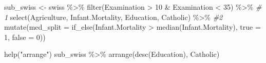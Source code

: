 \documentclass[
]{book}
\newenvironment{Shaded}{\begin{snugshade}}{\end{snugshade}}
\newcommand{\AttributeTok}[1]{\textcolor[rgb]{0.77,0.63,0.00}{#1}}
\newcommand{\CommentTok}[1]{\textcolor[rgb]{0.56,0.35,0.01}{\textit{#1}}}
\newcommand{\DecValTok}[1]{\textcolor[rgb]{0.00,0.00,0.81}{#1}}
\newcommand{\FunctionTok}[1]{\textcolor[rgb]{0.00,0.00,0.00}{#1}}
\newcommand{\NormalTok}[1]{#1}
\newcommand{\OtherTok}[1]{\textcolor[rgb]{0.56,0.35,0.01}{#1}}
\newcommand{\SpecialCharTok}[1]{\textcolor[rgb]{0.00,0.00,0.00}{#1}}
\newcommand{\StringTok}[1]{\textcolor[rgb]{0.31,0.60,0.02}{#1}}
\begin{document}
\begin{Shaded}
\begin{Highlighting}[]
\NormalTok{sub\_swiss }\OtherTok{\textless{}{-}}\NormalTok{ swiss }\SpecialCharTok{\%\textgreater{}\%} 
  \FunctionTok{filter}\NormalTok{(Examination }\SpecialCharTok{\textgreater{}} \DecValTok{10} \SpecialCharTok{\&}\NormalTok{ Examination }\SpecialCharTok{\textless{}} \DecValTok{35}\NormalTok{) }\SpecialCharTok{\%\textgreater{}\%}  \CommentTok{\# 1}
  \FunctionTok{select}\NormalTok{(Agriculture, Infant.Mortality, Education, Catholic) }\SpecialCharTok{\%\textgreater{}\%} \CommentTok{\#2}
  \FunctionTok{mutate}\NormalTok{(}\AttributeTok{med\_split =} \FunctionTok{if\_else}\NormalTok{(Infant.Mortality }\SpecialCharTok{\textgreater{}} \FunctionTok{median}\NormalTok{(Infant.Mortality),}
                             \AttributeTok{true =} \DecValTok{1}\NormalTok{,}
                             \AttributeTok{false =}  \DecValTok{0}\NormalTok{))}

\FunctionTok{help}\NormalTok{(}\StringTok{"arrange"}\NormalTok{)}
\NormalTok{sub\_swiss }\SpecialCharTok{\%\textgreater{}\%} 
  \FunctionTok{arrange}\NormalTok{(}\FunctionTok{desc}\NormalTok{(Education),}
\NormalTok{          Catholic)}
\end{Highlighting}
\end{Shaded}
\end{document}
